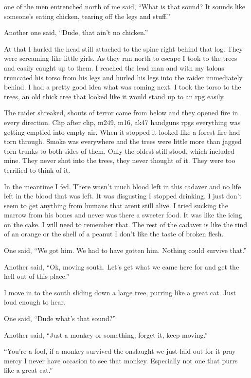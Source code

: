 one of the men entrenched north of me said, ``What is that sound? It sounds like someone's eating chicken, tearing off the legs and stuff.''

Another one said, ``Dude, that ain't no chicken.''

At that I hurled the head still attached to the spine right behind that log. They were screaming like little girls. As they ran north to escape I took to the trees and easily caught up to them. I reached the lead man and with my talons truncated his torso from his legs and hurled his legs into the raider immediately behind. I had a pretty good idea what was coming next. I took the torso to the trees, an old thick tree that looked like it would stand up to an rpg easily. 

The raider shreaked, shouts of terror came from below and they opened fire in every direction. Clip after clip, m249, m16, ak47 handguns rpgs everything was getting emptied into empty air. When it stopped it looked like a forest fire had torn through. Smoke was everywhere and the trees were little more than jagged torn trunks to both sides of them. Only the oldest still stood, which included mine. They never shot into the trees, they never thought of it. They were too terrified to think of it.

In the meantime I fed. There wasn't much blood left in this cadaver and no life left in the blood that was left. It was disgusting I stopped drinking. I just don't seem to get anything from humans that arent still alive. I tried sucking the marrow from his bones and never was there a sweeter food. It was like the icing on the cake. I will need to remember that. The rest of the cadaver is like the rind of an orange or the shell of a peanut I don't like the taste of broken flesh.

One said, ``We got him. We had to have gotten him. Nothing could survive that.''

Another said, ``Ok, moving south. Let's get what we came here for and get the hell out of this place.''

I move in to the south sliding down a large tree, purring like a great cat. Just loud enough to hear.

One said, ``Dude what's that sound?''

Another said, ``Just a monkey or something, forget it, keep moving.''

``You're a fool, if a monkey survived the onslaught we just laid out for it pray mercy I never have occasion to see that monkey. Especially not one that purrs like a great cat.''

